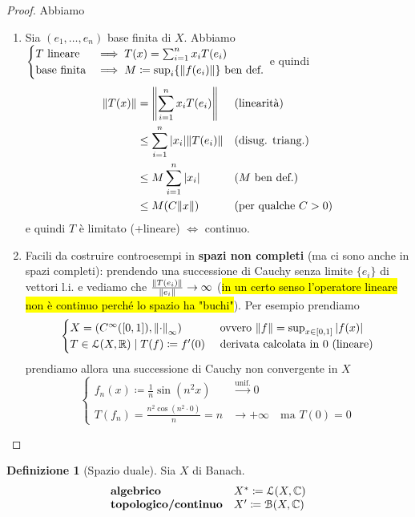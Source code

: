 \documentclass[a4paper,10pt]{article}
\theoremstyle{definition}
\newcommand{\re}{\mathbb{R}} %
\newcommand{\im}{\mathbb{C}} %
\theoremstyle{indentdefinition}
\newtheorem{defn}{Definizione}[section]
\theoremstyle{indenttheorem}
\theoremstyle{myremark}
\theoremstyle{indentgeneral}
\begin{document}
\begin{proof}
    Abbiamo
    \begin{enumerate}
        \item Sia $(e_1,\dots,e_n)$ base finita di $X$. Abbiamo $\begin{cases}
               T \text{ lineare}&\implies T(x)=\sum_{i=1}^nx_iT(e_i)\\
               \text{base finita}&\implies M\coloneqq \sup_i\{\norm{f(e_i)}\} \text{ ben def.}
           \end{cases}$ e quindi
        \begin{align*}
        \norm{T(x)}&=\norm{\sum_{i=1}^nx_iT(e_i)} && \text{(linearità)}\\
           &\le \sum_{i=1}^n\abs{x_i}\norm{T(e_i)} &&\text{(disug. triang.)}\\
           &\le M\sum_{i=1}^n\abs{x_i} &&(M\text{ ben def.)}\\
           &\le M(C\norm{x}) && \text{(per qualche }C>0)
        \end{align*}
        e quindi $T$ è limitato (+lineare) $\iff$ continuo.
        \item Facili da costruire controesempi in \textbf{spazi non completi} (ma ci sono anche in spazi completi): prendendo una successione di Cauchy senza limite $\{e_i\}$ di vettori l.i. e vediamo che $\frac{\norm{T(e_i)}}{\norm{e_i}}\to\infty$ (\hl{in un certo senso l'operatore lineare non è continuo perché lo spazio ha "buchi"}). Per esempio prendiamo
        $$\begin{cases}
            X=(C^\infty([0,1]),\norm{\cdot}_\infty) &\text{ ovvero }\norm{f}=\sup_{x\in[0,1]}\abs{f(x)}\\
            T\in\mathcal{L}(X,\re)\mid T(f)\coloneqq f'(0) &\text{ derivata calcolata in 0 (lineare)}
        \end{cases}$$
        prendiamo allora una successione di Cauchy non convergente in $X$
        $$\begin{cases}
            f_n(x)\coloneqq\frac{1}{n}\sin(n^2x)&\overset{\text{unif.}}{\longrightarrow} 0\\
            T(f_n)=\frac{n^2\cos(n^2\cdot 0)}{n}=n&\longrightarrow +\infty \quad \text{ma }T(0)=0
        \end{cases}$$
    \end{enumerate} 
\end{proof}

\begin{defn}[Spazio duale] Sia $X$ di Banach.
     $$\begin{array}{ll}
      \text{\textbf{algebrico}} & X^*\coloneqq\mathcal{L}(X,\im) \\
       \text{\textbf{topologico/continuo}} & X'\coloneqq\mathcal{B}(X,\im)
    \end{array}$$
\end{defn}
\end{document}
